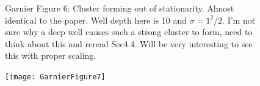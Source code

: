 \documentclass[11pt,a4paper, final, dvipsnames]{article}
\begin{document}
\begin{figure}
\begin{minipage}[b]{0.49\textwidth}
    \end{minipage}
    \caption{Garnier Figure 6: Cluster forming out of stationarity. Almost identical to the paper. Well depth here is 10 and $\sigma = 1^2/2$. I'm not sure why a deep well causes such a strong cluster to form, need to think about this and reread Sec4.4. Will be very interesting to see this with proper scaling.}
\end{figure}

    \begin{figure}
    \centering
    \begin{minipage}[b]{\textwidth}
        \centering
        
        \texttt{[image: GarnierFigure7]}
    \end{minipage} \\
    

\end{figure}
\end{document}
